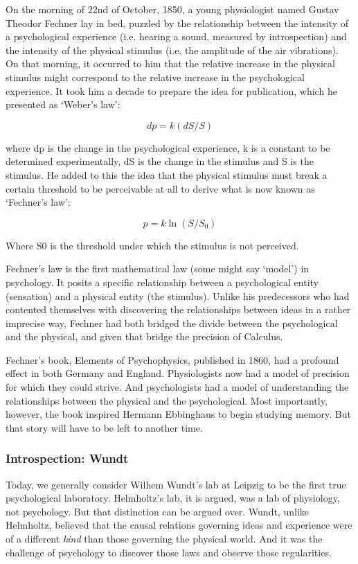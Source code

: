 \begin{refsection}
On the morning of 22nd of October, 1850, a young physiologist named Gustav Theodor Fechner lay in bed, puzzled by the relationship between the intensity of a psychological experience (i.e. hearing a sound, measured by introspection) and the intensity of the physical stimulus (i.e. the amplitude of the air vibrations). On that morning, it occurred to him that the relative increase in the physical stimulus might correspond to the relative increase in the psychological experience. It took him a decade to prepare the idea for publication, which he presented as `Weber's law':

\[ dp  = k(dS/S) \]

where dp is the change in the psychological experience, k is a constant to be determined experimentally, dS is the change in the stimulus and S is the stimulus. He added to this the idea that the physical stimulus must break a certain threshold to be perceivable at all to derive what is now known as `Fechner's law':

\[ p = k\ln(S/S_{0}) \] 

Where S0 is the threshold under which the stimulus is not perceived.

Fechner's law is the first mathematical law (some might say `model') in psychology. It posits a specific relationship between a psychological entity (sensation) and a physical entity (the stimulus). Unlike his predecessors who had contented themselves with discovering the relationships between ideas in a rather imprecise way, Fechner had both bridged the divide between the psychological and the physical, and given that bridge the precision of Calculus. 

Fechner's book, Elements of Psychophysics, published in 1860, had a profound effect in both Germany and England. Physiologists now had a model of precision for which they could strive. And psychologists had a model of understanding the relationships between the physical and the psychological. Most importantly, however, the book inspired Hermann Ebbinghaus to begin studying memory. But that story will have to be left to another time.

\subsubsection{Introspection: Wundt}
\label{introspection:wundt}

Today, we generally consider Wilhem Wundt's lab at Leipzig to be the first true psychological laboratory. Helmholtz's lab, it is argued, was a lab of physiology, not psychology. But that distinction can be argued over. Wundt, unlike Helmholtz, believed that the causal relations governing ideas and experience were of a different \emph{kind} than those governing the physical world. And it was the challenge of psychology to discover those laws and observe those regularities.


\end{refsection}
